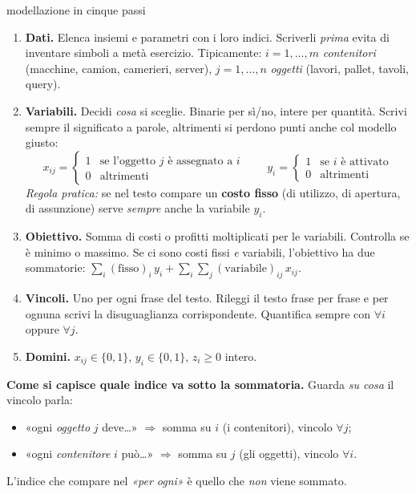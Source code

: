 \documentclass[11pt,a4paper]{article}
\begin{document}
\begin{ric}{modellazione in cinque passi}
\begin{enumerate}
\item \textbf{Dati.} Elenca insiemi e parametri con i loro indici. Scriverli \emph{prima}
      evita di inventare simboli a metà esercizio.
      Tipicamente: $i = 1,\dots,m$ \emph{contenitori} (macchine, camion, camerieri, server),
      $j = 1,\dots,n$ \emph{oggetti} (lavori, pallet, tavoli, query).

\item \textbf{Variabili.} Decidi \emph{cosa} si sceglie. Binarie per sì/no, intere per quantità.
      Scrivi sempre il significato a parole, altrimenti si perdono punti anche col modello giusto:
      \[ x_{ij} = \begin{cases} 1 & \text{se l'oggetto $j$ è assegnato a $i$}\\ 0 & \text{altrimenti}\end{cases}
         \qquad
         y_{i} = \begin{cases} 1 & \text{se $i$ è attivato}\\ 0 & \text{altrimenti}\end{cases}\]
      \emph{Regola pratica:} se nel testo compare un \textbf{costo fisso} (di utilizzo, di
      apertura, di assunzione) serve \emph{sempre} anche la variabile $y_i$.

\item \textbf{Obiettivo.} Somma di costi o profitti moltiplicati per le variabili.
      Controlla se è minimo o massimo. Se ci sono costi fissi \emph{e} variabili,
      l'obiettivo ha due sommatorie: $\sum_i (\text{fisso})_i\, y_i + \sum_i\sum_j (\text{variabile})_{ij}\, x_{ij}$.

\item \textbf{Vincoli.} Uno per ogni frase del testo. Rileggi il testo frase per frase
      e per ognuna scrivi la disuguaglianza corrispondente. Quantifica sempre con $\forall i$ oppure $\forall j$.

\item \textbf{Domini.} $x_{ij} \in \{0,1\}$, \quad $y_i \in \{0,1\}$, \quad $z_i \ge 0$ intero.
\end{enumerate}
\end{ric}

\begin{idea}
\textbf{Come si capisce quale indice va sotto la sommatoria.} Guarda \emph{su cosa} il vincolo
parla:
\begin{itemize}
\item «ogni \emph{oggetto} $j$ deve\dots» $\Rightarrow$ somma su $i$ (i contenitori), vincolo $\forall j$;
\item «ogni \emph{contenitore} $i$ può\dots» $\Rightarrow$ somma su $j$ (gli oggetti), vincolo $\forall i$.
\end{itemize}
L'indice che compare nel \emph{«per ogni»} è quello che \emph{non} viene sommato.
\end{idea}
\end{document}
